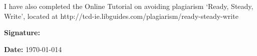 \documentclass[12pt]{article} %
\begin{document}
	\noindent I have also completed the Online Tutorial on avoiding plagiarism ‘Ready, Steady, Write’, located at http://tcd-ie.libguides.com/plagiarism/ready-steady-write \\
	
	\vspace{.7cm}
	
	
	\begin{flushleft}
		\begin{minipage}{0.5\linewidth}
			\textbf{Signature:}
		\end{minipage}
	\end{flushleft}
	
	\vspace{.3cm}
	
	\noindent \textbf{Date: } \today 4 %
	
\end{document}
